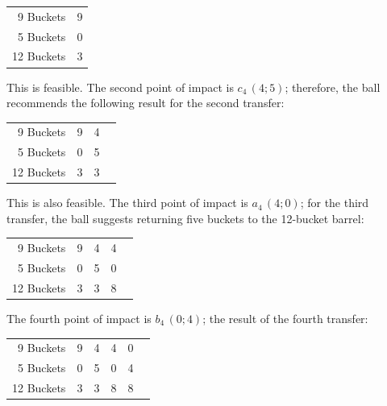 \begin{small}
\begin{center}
\begin{tabular}{@{}r *{1}{c}@{}}
\toprule
9 Buckets & 9  \\
5 Buckets & 0 \\
12 Buckets & 3\\ 
\bottomrule
\end{tabular}
\end{center}
\end{small}

This is feasible. The second point of impact is $c_{4}\, (4; 5)$; therefore, the ball recommends the following result for the second transfer:

\begin{small}
\begin{center}
\begin{tabular}{@{}r *{3}{c}@{}}
\toprule
9 Buckets & 9  & 4 &\\
5 Buckets & 0 & 5 & \\
12 Buckets & 3 & 3 & \\ 
\bottomrule
\end{tabular}
\end{center}
\end{small}

This is also feasible. The third point of impact is $a_{4}\, (4; 0)$; for the third transfer, the ball suggests returning five buckets to the 12-bucket barrel:

\begin{small}
\begin{center}
\begin{tabular}{@{}r *{4}{c}@{}}
\toprule
9 Buckets & 9  & 4 & 4 & \\
5 Buckets & 0 & 5 & 0 & \\
12 Buckets & 3 & 3 & 8 &\\ 
\bottomrule
\end{tabular}
\end{center}
\end{small}

The fourth point of impact is $b_{4}\, (0; 4)$; the result of the fourth transfer:

\begin{small}
\begin{center}
\begin{tabular}{@{}r *{5}{c}@{}}
\toprule
9 Buckets & 9  & 4 & 4 & 0 & \\
5 Buckets & 0 & 5 & 0 & 4 & \\
12 Buckets & 3 & 3 & 8 & 8 & \\ 
\bottomrule
\end{tabular}
\end{center}
\end{small}

